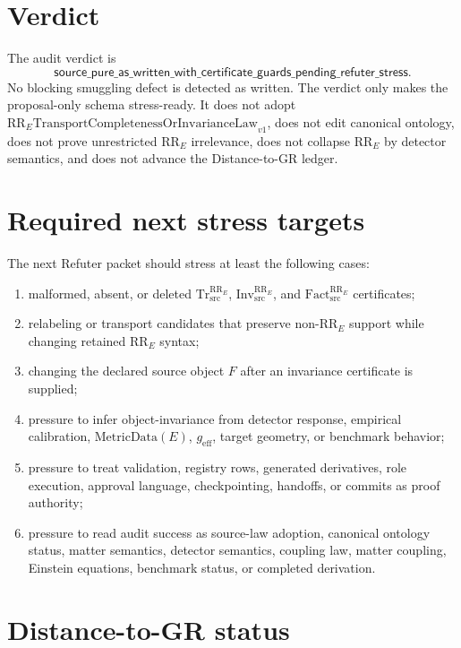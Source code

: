 \documentclass[11pt]{article}
\newcommand{\RRE}{\mathrm{RR}_{E}}
\newcommand{\TrRR}{\mathrm{Tr}^{\RRE}_{\mathrm{src}}}
\newcommand{\InvRR}{\mathrm{Inv}^{\RRE}_{\mathrm{src}}}
\newcommand{\FactRR}{\mathrm{Fact}^{\RRE}_{\mathrm{src}}}
\newcommand{\LawRR}{\mathrm{RR}_{E}\mathrm{TransportCompletenessOrInvarianceLaw}_{v1}}
\newcommand{\MetricData}{\mathrm{MetricData}}
\newcommand{\geff}{g_{\mathrm{eff}}}
\newcommand{\AuditVerdict}{\mathsf{source\_pure\_as\_written\_with\_certificate\_guards\_pending\_refuter\_stress}}
\begin{document}
\section{Verdict}

The audit verdict is
\[
  \AuditVerdict .
\]
No blocking smuggling defect is detected as written. The verdict only makes the
proposal-only schema stress-ready. It does not adopt \(\LawRR\), does not edit
canonical ontology, does not prove unrestricted \(\RRE\) irrelevance, does not
collapse \(\RRE\) by detector semantics, and does not advance the
Distance-to-GR ledger.

\section{Required next stress targets}

The next Refuter packet should stress at least the following cases:
\begin{enumerate}[label=(\alph*)]
  \item malformed, absent, or deleted \(\TrRR\), \(\InvRR\), and \(\FactRR\)
  certificates;
  \item relabeling or transport candidates that preserve non-\(\RRE\) support
  while changing retained \(\RRE\) syntax;
  \item changing the declared source object \(F\) after an invariance
  certificate is supplied;
  \item pressure to infer object-invariance from detector response, empirical
  calibration, \(\MetricData(E)\), \(\geff\), target geometry, or benchmark
  behavior;
  \item pressure to treat validation, registry rows, generated derivatives,
  role execution, approval language, checkpointing, handoffs, or commits as
  proof authority;
  \item pressure to read audit success as source-law adoption, canonical
  ontology status, matter semantics, detector semantics, coupling law, matter
  coupling, Einstein equations, benchmark status, or completed derivation.
\end{enumerate}

\section{Distance-to-GR status}
\end{document}
